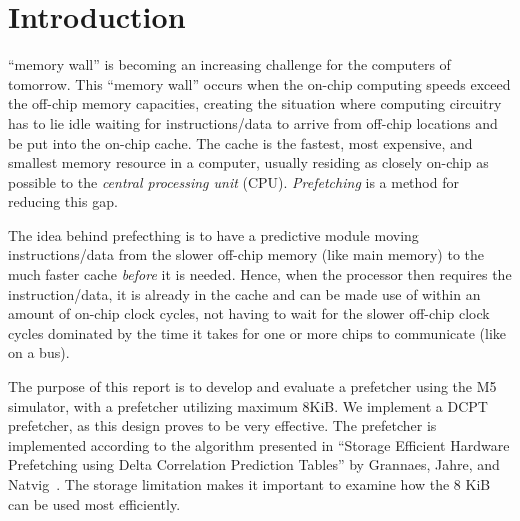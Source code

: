 \section{Introduction}

 ``memory wall'' is becoming an increasing challenge for the
computers of tomorrow. This ``memory wall'' occurs when the on-chip computing speeds
exceed the off-chip memory capacities, creating the situation where computing
circuitry has to lie idle waiting for instructions/data to arrive from off-chip
locations and be put into the on-chip cache. The cache is the fastest, most
expensive, and smallest memory resource in a computer, usually residing as closely
on-chip as possible to the \emph{central processing unit} (CPU). \emph{Prefetching}
is a method for reducing this gap.

The idea behind prefecthing is to have a predictive module moving
instructions/data from the slower off-chip memory (like main memory) to the much
faster cache \emph{before} it is needed. Hence, when the processor then requires
the instruction/data, it is already in the cache and can be made use of within
an amount of on-chip clock cycles, not having to wait for the slower off-chip
clock cycles dominated by the time it takes for one or more chips to communicate
(like on a bus).

The purpose of this report is to develop and evaluate a prefetcher using the M5
simulator, with a prefetcher utilizing maximum 8KiB. We implement a DCPT
prefetcher, as this design proves to be very effective. The prefetcher is
implemented according to the algorithm presented in ``Storage Efficient Hardware
Prefetching using Delta Correlation Prediction Tables'' by Grannaes, Jahre, and
Natvig~\cite{dcpt}. The storage limitation makes it important to examine how the
8 KiB can be used most efficiently. 

